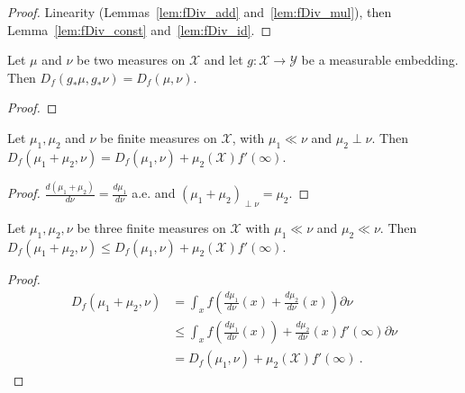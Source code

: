 \begin{proof}\leanok
{}
Linearity (Lemmas~\ref{lem:fDiv_add} and~\ref{lem:fDiv_mul}), then Lemma~\ref{lem:fDiv_const} and~\ref{lem:fDiv_id}.
\end{proof}

\begin{lemma}
  \label{lem:fDiv_map_measurableEmbedding}
  \leanok
  Let $\mu$ and $\nu$ be two measures on $\mathcal X$ and let $g : \mathcal X \to \mathcal Y$ be a measurable embedding. Then $D_f(g_* \mu, g_* \nu) = D_f(\mu, \nu)$.
\end{lemma}

\begin{proof}\leanok
\end{proof}

\begin{lemma}
  \label{lem:fDiv_absolutelyContinuous_add_mutuallySingular}
  \leanok
  Let $\mu_1, \mu_2$ and $\nu$ be finite measures on $\mathcal X$, with $\mu_1 \ll \nu$ and $\mu_2 \perp \nu$.
  Then $D_f(\mu_1 + \mu_2, \nu) = D_f(\mu_1, \nu) + \mu_2(\mathcal X) f'(\infty)$.
\end{lemma}

\begin{proof}\leanok
$\frac{d(\mu_1 + \mu_2)}{d \nu} = \frac{d \mu_1}{d \nu}$ a.e. and $(\mu_1 + \mu_2)_{\perp \nu} = \mu_2$.
\end{proof}

\begin{lemma}
  \label{lem:fDiv_add_measure_le_of_ac}
  \leanok
  Let $\mu_1, \mu_2, \nu$ be three finite measures on $\mathcal X$ with $\mu_1 \ll \nu$ and $\mu_2 \ll \nu$. Then
  $D_f(\mu_1 + \mu_2, \nu) \le D_f(\mu_1, \nu) + \mu_2(\mathcal X) f'(\infty)$.
\end{lemma}

\begin{proof}\leanok
\begin{align*}
D_f(\mu_1 + \mu_2, \nu)
&= \int_x f \left( \frac{d \mu_1}{d\nu}(x) + \frac{d\mu_2}{d\nu}(x) \right) \partial \nu
\\
&\le \int_x f \left( \frac{d \mu_1}{d\nu}(x) \right) + \frac{d\mu_2}{d\nu}(x) f'(\infty) \partial \nu
\\
&= D_f(\mu_1, \nu) + \mu_2(\mathcal X) f'(\infty)
\: .
\end{align*}
\end{proof}


